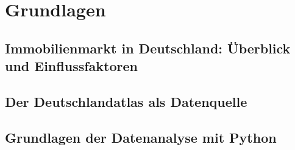 \newpage

\section{Grundlagen} \label{grundlagen}

\subsection{Immobilienmarkt in Deutschland: Überblick und Einflussfaktoren} \label{immobilienmarktindeutschlandueberblickundeinflussfaktoren}


\subsection{Der Deutschlandatlas als Datenquelle} \label{derdeutschlandatlasalsdatenquelle}


\subsection{Grundlagen der Datenanalyse mit Python} \label{grundlagenderdatenanalysemitpython}

